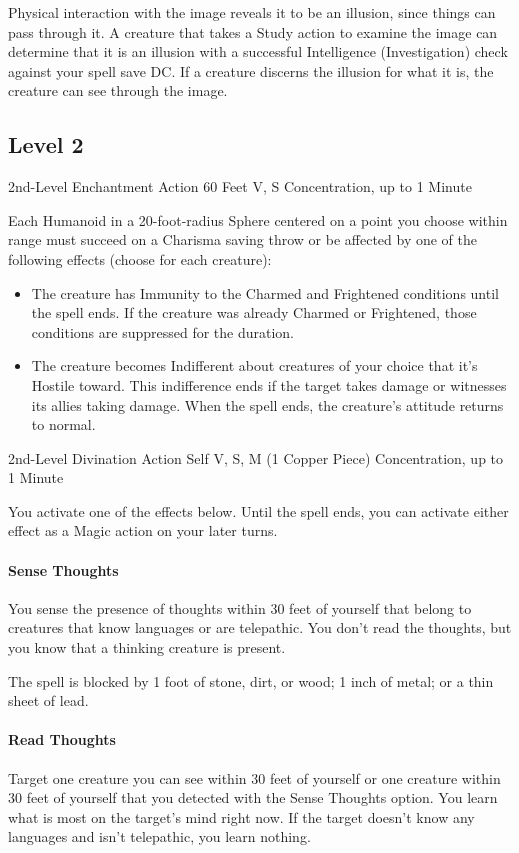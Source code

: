 \documentclass[letterpaper,openany,oneside,twocolumn]{book}
\begin{document}
Physical interaction with the image reveals it to be an illusion, since things can pass through it. A creature that takes a Study action to examine the image can determine that it is an illusion with a successful Intelligence (Investigation) check against your spell save DC. If a creature discerns the illusion for what it is, the creature can see through the image.

\subsection*{Level 2}
	{2nd-Level Enchantment}
	{Action}
	{60 Feet}
	{V, S}
	{Concentration, up to 1 Minute}

Each Humanoid in a 20-foot-radius Sphere centered on a point you choose within range must succeed on a Charisma saving throw or be affected by one of the following effects (choose for each creature):
\begin{itemize}
	\item The creature has Immunity to the Charmed and Frightened conditions until the spell ends. If the creature was already Charmed or Frightened, those conditions are suppressed for the duration.
	\item The creature becomes Indifferent about creatures of your choice that it's Hostile toward. This indifference ends if the target takes damage or witnesses its allies taking damage. When the spell ends, the creature's attitude returns to normal.
\end{itemize}

	{2nd-Level Divination}
	{Action}
	{Self}
	{V, S, M (1 Copper Piece)}
	{Concentration, up to 1 Minute}

You activate one of the effects below. Until the spell ends, you can activate either effect as a Magic action on your later turns.

\paragraph*{Sense Thoughts} You sense the presence of thoughts within 30 feet of yourself that belong to creatures that know languages or are telepathic. You don't read the thoughts, but you know that a thinking creature is present.

The spell is blocked by 1 foot of stone, dirt, or wood; 1 inch of metal; or a thin sheet of lead.

\paragraph*{Read Thoughts} Target one creature you can see within 30 feet of yourself or one creature within 30 feet of yourself that you detected with the Sense Thoughts option. You learn what is most on the target's mind right now. If the target doesn't know any languages and isn't telepathic, you learn nothing.
\end{document}

